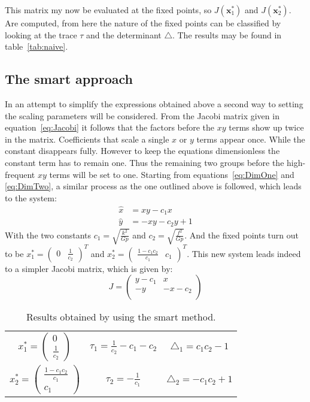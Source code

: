 This matrix my now be evaluated at the fixed points, so $J(\mathbf{x}^*_1)$ and $J(\mathbf{x}^*_2)$. Are computed, from here the nature of the fixed points can be classified by looking at the trace $\tau$ and the determinant $\triangle$. The results may be found in table~\ref{tab:naive}.

\subsection{The smart approach}
In an attempt to simplify the expressions obtained above a second way to setting the scaling parameters will be considered. From the Jacobi matrix given in equation~\ref{eq:Jacobi} it follows that the factors before the $xy$ terms show up twice in the matrix. Coefficients that scale a single $x$ or $y$ terms appear once. While the constant disappears fully. However to keep the equations dimensionless the constant term has to remain one. Thus the remaining two groups before the high-frequent $xy$ terms will be set to one. Starting from equations~\ref{eq:DimOne} and \ref{eq:DimTwo}, a similar process as the one outlined above is followed, which leads to the system:
\begin{align}
\hat{x} &= xy - c_1 x \\
\hat{y} &= -xy - c_2 y + 1
\end{align}  
With the two constants $c_1 = \sqrt{\frac{k^2}{Gp}}$ and $c_2 = \sqrt{\frac{f^2}{Gp}}$. And the fixed points turn out to be $x_1^* = \begin{pmatrix} 0 & \frac{1}{c_2} \end{pmatrix}^T$ and $x_2^* = \begin{pmatrix} \frac{1- c_1c_2 }{c_1} & c_1 \end{pmatrix}^T$.
This new system leads indeed to a simpler Jacobi matrix, which is given by:
\begin{equation}
J = \begin{pmatrix}
y - c_1 & x \\
-y & -x - c_2 \\
\end{pmatrix}
\end{equation}
\begin{table}
\centering
\begin{tabular}{|c|c|c|}
\hline
$x_1^* = \begin{pmatrix} 0 \\ \frac{1}{c_2} \end{pmatrix}$ 
& $\tau_1 = \frac{1}{c_2} - c_1 - c_2$  & $\triangle_1 = c_1 c_2 - 1$ \\
$x_2^* = \begin{pmatrix} \frac{1- c_1c_2 }{c_1} \\ c_1 \end{pmatrix}$ 
& $\tau_2 = -\frac{1}{c_1}$  & $\triangle_2 = - c_1 c_2 + 1$ \\
\hline
\end{tabular}
\caption{Results obtained by using the smart method.}
\label{tab:smart}
\end{table}
